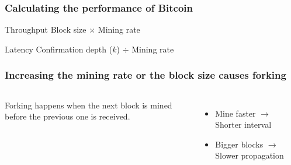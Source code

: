 \documentclass[aspectratio=169]{beamer}
\begin{document}
\begin{frame}
    \frametitle{Calculating the performance of Bitcoin}
    \pause
    \begin{block}{Throughput}
        \alert<5>{Block size} $\times$ \alert<4>{Mining rate}
    \end{block}
    \pause
    \begin{block}{Latency}
        Confirmation depth ($k$) $\div$ \alert<4>{Mining rate}
    \end{block}
\end{frame}

\begin{frame}
    \frametitle{Increasing the mining rate or the block size causes forking}
    \begin{columns}
        Forking happens when the next block is mined before the previous one is received.
        \pause
        \begin{itemize}
            \item Mine faster $\rightarrow$ Shorter interval
                \pause
            \item Bigger blocks $\rightarrow$ Slower propagation
        \end{itemize}
    \end{columns}
\end{frame}
\end{document}
